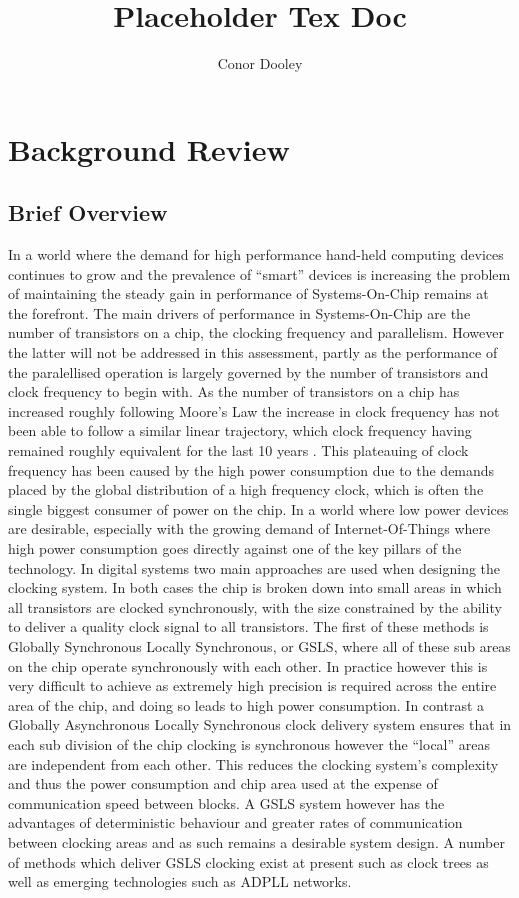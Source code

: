 \documentclass[12pt,english,british]{report}
\begin{document}
\title{Placeholder Tex Doc}
\author{Conor Dooley}
\maketitle
\chapter{Background Review}
\section{Brief Overview}

In a world where the demand for high performance hand-held computing devices continues to grow and the prevalence of ``smart'' devices is increasing the problem of maintaining the steady gain in performance of Systems-On-Chip remains at the forefront. %
The main drivers of performance in Systems-On-Chip are the number of transistors on a chip, the clocking frequency and parallelism. However the latter will not be addressed in this assessment, partly as the performance of the paralellised operation is largely governed by the number of transistors and clock frequency to begin with. %
As the number of transistors on a chip has increased roughly following Moore's Law the increase in clock frequency has not been able to follow a similar linear trajectory, which clock frequency having remained roughly equivalent for the last 10 years \cite{ross2008cpu}.
This plateauing of clock frequency has been caused by the high power consumption due to the demands placed by the global distribution of a high frequency clock, which is often the single biggest consumer of power on the chip. %
In a world where low power devices are desirable, especially with the growing demand of Internet-Of-Things where high power consumption goes directly against one of the key pillars of the technology. %
In digital systems two main approaches are used when designing the clocking system. In both cases the chip is broken down into small areas in which all transistors are clocked synchronously, with the size constrained by the ability to deliver a quality clock signal to all transistors. The first of these methods is Globally Synchronous Locally Synchronous, or GSLS, where all of these sub areas on the chip operate synchronously with each other. In practice however this is very difficult to achieve as extremely high precision is required across the entire area of the chip, and doing so leads to high power consumption.
In contrast a Globally Asynchronous Locally Synchronous clock delivery system ensures that in each sub division of the chip clocking is synchronous however the ``local'' areas are independent from each other. This reduces the clocking system's complexity and thus the power consumption and chip area used at the expense of communication speed between blocks. %
A GSLS system however has the advantages of deterministic behaviour and greater rates of communication between clocking areas and as such remains a desirable system design. A number of methods which deliver GSLS clocking exist at present such as clock trees as well as emerging technologies such as ADPLL networks.
\end{document}
